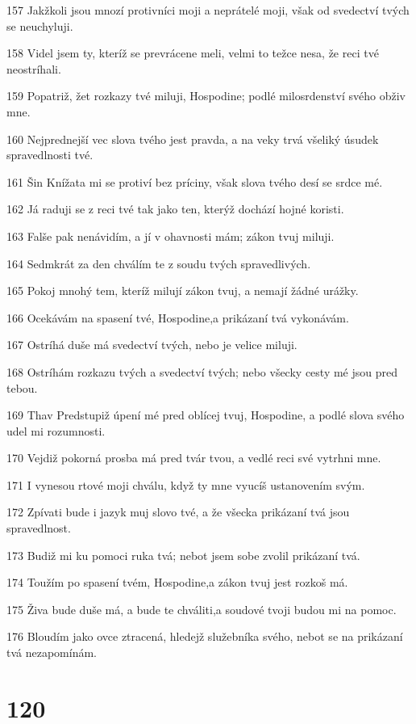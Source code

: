\par 157 Jakžkoli jsou mnozí protivníci moji a neprátelé moji, však od svedectví tvých se neuchyluji.
\par 158 Videl jsem ty, kteríž se prevrácene meli, velmi to težce nesa, že reci tvé neostríhali.
\par 159 Popatriž, žet rozkazy tvé miluji, Hospodine; podlé milosrdenství svého obživ mne.
\par 160 Nejprednejší vec slova tvého jest pravda, a na veky trvá všeliký úsudek spravedlnosti tvé.
\par 161 Šin Knížata mi se protiví bez príciny, však slova tvého desí se srdce mé.
\par 162 Já raduji se z reci tvé tak jako ten, kterýž dochází hojné koristi.
\par 163 Falše pak nenávidím, a jí v ohavnosti mám; zákon tvuj miluji.
\par 164 Sedmkrát za den chválím te z soudu tvých spravedlivých.
\par 165 Pokoj mnohý tem, kteríž milují zákon tvuj, a nemají žádné urážky.
\par 166 Ocekávám na spasení tvé, Hospodine,a prikázaní tvá vykonávám.
\par 167 Ostríhá duše má svedectví tvých, nebo je velice miluji.
\par 168 Ostríhám rozkazu tvých a svedectví tvých; nebo všecky cesty mé jsou pred tebou.
\par 169 Thav Predstupiž úpení mé pred oblícej tvuj, Hospodine, a podlé slova svého udel mi rozumnosti.
\par 170 Vejdiž pokorná prosba má pred tvár tvou, a vedlé reci své vytrhni mne.
\par 171 I vynesou rtové moji chválu, když ty mne vyucíš ustanovením svým.
\par 172 Zpívati bude i jazyk muj slovo tvé, a že všecka prikázaní tvá jsou spravedlnost.
\par 173 Budiž mi ku pomoci ruka tvá; nebot jsem sobe zvolil prikázaní tvá.
\par 174 Toužím po spasení tvém, Hospodine,a zákon tvuj jest rozkoš má.
\par 175 Živa bude duše má, a bude te chváliti,a soudové tvoji budou mi na pomoc.
\par 176 Bloudím jako ovce ztracená, hledejž služebníka svého, nebot se na prikázaní tvá nezapomínám.

\chapter{120}


